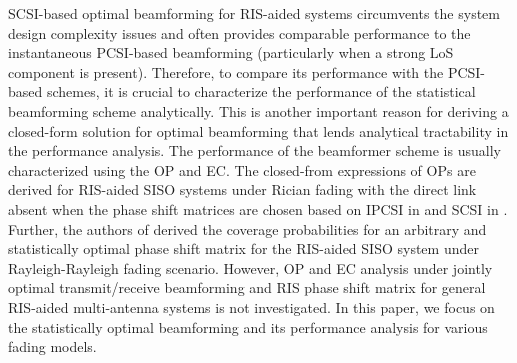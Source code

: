 \documentclass[journal,draftclsnofoot,onecolumn,12pt]{IEEEtran}
\begin{document}
SCSI-based optimal beamforming for RIS-aided systems circumvents the system design complexity issues and often provides comparable performance to the instantaneous PCSI-based beamforming (particularly when a strong LoS component is present). Therefore, to compare its performance with the PCSI-based schemes, it is crucial to characterize the performance of the statistical beamforming scheme analytically. This is another important reason for deriving a closed-form solution for optimal beamforming that lends analytical tractability in the performance analysis.
The performance of the beamformer scheme is usually characterized using the OP and EC. 
The closed-from expressions of OPs are derived for RIS-aided SISO systems under Rician fading with the direct link absent when the phase shift matrices are chosen based on IPCSI  in \cite{BaoTingnan_2022_Outage} and SCSI in \cite{XUPeng_AsymOutProb_2022}. Further, the authors of \cite{VanChien} derived the coverage probabilities for an arbitrary and statistically optimal phase shift matrix for the RIS-aided SISO system under Rayleigh-Rayleigh fading scenario. However, OP and EC analysis under jointly optimal  transmit/receive beamforming and RIS phase shift matrix for general RIS-aided multi-antenna systems is not investigated. In this paper, we focus on the statistically optimal beamforming and its performance analysis for various fading models.  
\end{document}
